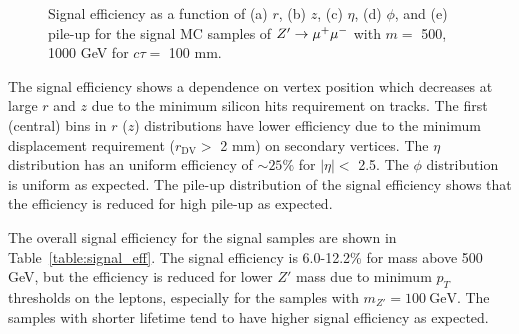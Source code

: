 \begin{figure}[!htb]
    \caption{Signal efficiency as a function of (a) $r$, (b) $z$, (c) $\eta$, (d) $\phi$, and (e) pile-up for the signal MC samples of $Z'\rightarrow \mu^{+}\mu^{-}$ with $m=$ 500, 1000 GeV for $c\tau=$ 100 mm.}
    \label{fig:signal_vertex_dist}
\end{figure}

The signal efficiency shows a dependence on vertex position which decreases at large $r$ and $z$ due to the minimum silicon hits requirement on tracks. The first (central) bins in $r$ ($z$) distributions have lower efficiency due to the minimum displacement requirement ($r_{\mathrm{DV}} > $ 2 mm) on secondary vertices. The $\eta$ distribution has an uniform efficiency of $\sim25\%$ for $|\eta|<$ 2.5. The $\phi$ distribution is uniform as expected. The pile-up distribution of the signal efficiency shows that the efficiency is reduced for high pile-up as expected.

The overall signal efficiency for the signal samples are shown in Table~\ref{table:signal_eff}. The signal efficiency is 6.0-12.2\% for mass above 500 GeV, but the efficiency is reduced for lower $Z'$ mass due to minimum $p_{T}$ thresholds on the leptons, especially for the samples with $m_{Z'}=100~\si{\GeV}$. The samples with shorter lifetime tend to have higher signal efficiency as expected. 


